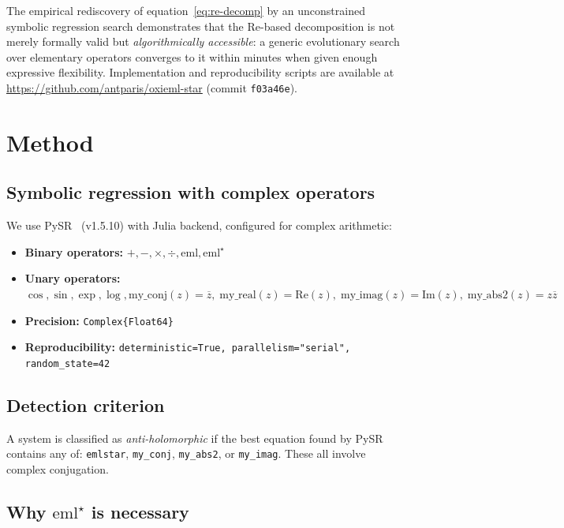 \documentclass[12pt,a4paper]{article}
\newcommand{\emlstar}{\mathrm{eml}^{\star}}
\newcommand{\eml}{\mathrm{eml}}
\newcommand{\conj}[1]{\overline{#1}}
\begin{document}
The empirical rediscovery of equation~\eqref{eq:re-decomp}
by an unconstrained symbolic regression search demonstrates
that the $\mathrm{Re}$-based decomposition is not merely
formally valid but \emph{algorithmically accessible}:
a generic evolutionary search over elementary operators
converges to it within minutes when given enough expressive flexibility.
Implementation and reproducibility scripts are available at
\url{https://github.com/antparis/oxieml-star}
(commit \texttt{f03a46e}).



\section{Method}
\label{sec:method}

\subsection{Symbolic regression with complex operators}

We use PySR~\citep{cranmer2023pysr} (v1.5.10) with Julia
backend, configured for complex arithmetic:

\begin{itemize}
\item \textbf{Binary operators:} $+, -, \times, \div, \eml, \emlstar$
\item \textbf{Unary operators:} $\cos, \sin, \exp, \log,
  \mathrm{my\_conj}(z) = \conj{z},\;
  \mathrm{my\_real}(z) = \mathrm{Re}(z),\;
  \mathrm{my\_imag}(z) = \mathrm{Im}(z),\;
  \mathrm{my\_abs2}(z) = z\conj{z}$
\item \textbf{Precision:} \texttt{Complex\{Float64\}}
\item \textbf{Reproducibility:} \texttt{deterministic=True,
  parallelism="serial", random\_state=42}
\end{itemize}

\subsection{Detection criterion}

A system is classified as \emph{anti-holomorphic} if the best
equation found by PySR contains any of: \texttt{emlstar},
\texttt{my\_conj}, \texttt{my\_abs2}, or \texttt{my\_imag}.
These all involve complex conjugation.

\subsection{Why $\emlstar$ is necessary}
\end{document}

